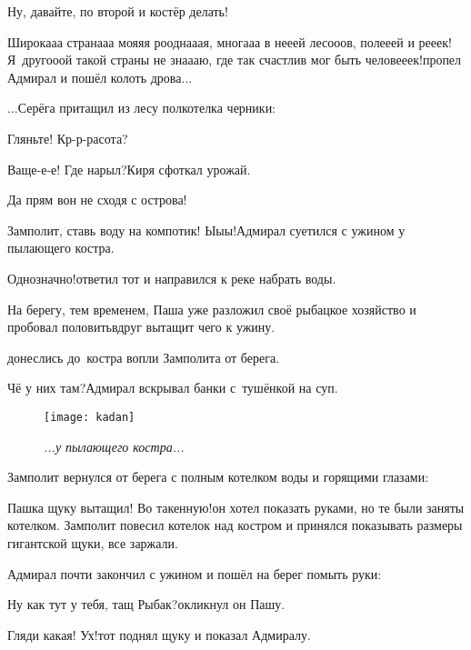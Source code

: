 \diagdash Ну, давайте, по второй и костёр делать!

\diagdash Широка\sdash а\sdash а страна\sdash а\sdash а моя\sdash я\sdash я роодна\sdash а\sdash ая, многа\sdash а\sdash а в не\sdash е\sdash ей лесо\sdash о\sdash ов, поле\sdash е\sdash ей и ре\sdash е\sdash ек! Я~друго\sdash о\sdash ой такой страны не зна\sdash а\sdash аю, где так счастлив мог быть челове\sdash е\sdash ек!\mdash пропел Адмирал и пошёл колоть дрова$\ldots$

\vspace{0.5cm} 
$\ldots$Серёга притащил из лесу полкотелка черники:

\diagdash Гляньте! Кр-р-расота?

\diagdash Ваще-е-е! Где нарыл?\mdash Киря сфоткал урожай.

\diagdash Да прям вон не сходя с острова!

\diagdash Замполит, ставь воду на компотик! Ы\sdash ы\sdash ы!\mdash Адмирал суетился с ужином у пылающего костра.

\diagdash Однозначно!\mdash ответил тот и направился к реке набрать воды.

На берегу, тем временем, Паша уже разложил своё рыбацкое хозяйство и пробовал половить\mdash вдруг вытащит чего к ужину. 

\mdash донеслись до~костра вопли Замполита от берега.

\diagdash Чё у них там?\mdash Адмирал вскрывал банки с~тушёнкой на суп.

\begin{figure}[h]
	\centering
	\texttt{[image: kadan]}
	\caption{\small\textit{...у пылающего костра...}}
\end{figure}

Замполит вернулся от берега с полным котелком воды и горящими глазами:

\diagdash Пашка щуку вытащил! Во такенную!\mdash он хотел показать руками, но те были заняты котелком. Замполит повесил котелок над костром и принялся показывать размеры гигантской щуки, все заржали.

Адмирал почти закончил с ужином и пошёл на берег помыть руки:

\diagdash Ну как тут у тебя, тащ Рыбак?\mdash окликнул он Пашу.

\diagdash Гляди какая! Ух!\mdash тот поднял щуку и показал Адмиралу.

